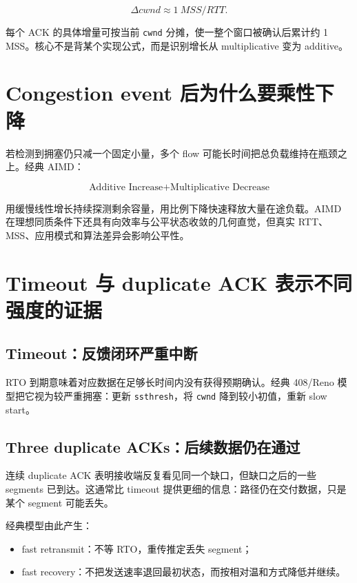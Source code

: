 \documentclass[UTF8,fontset=none,11pt,a4paper]{ctexart}
\providecommand{\tightlist}{\setlength{\itemsep}{0pt}\setlength{\parskip}{0pt}}
\providecommand{\passthrough}[1]{#1}
\begin{document}
\[
\Delta cwnd\approx 1\ MSS/RTT.
\]

每个 ACK 的具体增量可按当前 \passthrough{\lstinline!cwnd!}
分摊，使一整个窗口被确认后累计约 1
MSS。核心不是背某个实现公式，而是识别增长从 multiplicative 变为
additive。

\section{Congestion event
后为什么要乘性下降}\label{6-congestion-event-ux540eux4e3aux4ec0ux4e48ux8981ux4e58ux6027ux4e0bux964d}

若检测到拥塞仍只减一个固定小量，多个 flow
可能长时间把总负载维持在瓶颈之上。经典 AIMD：

\[
\boxed{\text{Additive Increase} + \text{Multiplicative Decrease}}
\]

用缓慢线性增长持续探测剩余容量，用比例下降快速释放大量在途负载。AIMD
在理想同质条件下还具有向效率与公平状态收敛的几何直觉，但真实
RTT、MSS、应用模式和算法差异会影响公平性。

\section{Timeout 与 duplicate ACK
表示不同强度的证据}\label{7-timeout-ux4e0e-duplicate-ack-ux8868ux793aux4e0dux540cux5f3aux5ea6ux7684ux8bc1ux636e}

\subsection{Timeout：反馈闭环严重中断}\label{71-timeoutux53cdux9988ux95edux73afux4e25ux91cdux4e2dux65ad}

RTO 到期意味着对应数据在足够长时间内没有获得预期确认。经典 408/Reno
模型把它视为较严重拥塞：更新 \passthrough{\lstinline!ssthresh!}，将
\passthrough{\lstinline!cwnd!} 降到较小初值，重新 slow start。

\subsection{Three duplicate
ACKs：后续数据仍在通过}\label{72-three-duplicate-acksux540eux7eedux6570ux636eux4ecdux5728ux901aux8fc7}

连续 duplicate ACK 表明接收端反复看见同一个缺口，但缺口之后的一些
segments 已到达。这通常比 timeout
提供更细的信息：路径仍在交付数据，只是某个 segment 可能丢失。

经典模型由此产生：

\begin{itemize}
\tightlist
\item
  fast retransmit：不等 RTO，重传推定丢失 segment；
\item
  fast recovery：不把发送速率退回最初状态，而按相对温和方式降低并继续。
\end{itemize}
\end{document}
